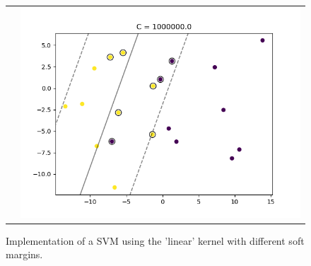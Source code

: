 \documentclass{beamer}
\begin{document}
\begin{frame}{}
\begin{figure}
\begin{tabular}{ll}
    		&
    		\includegraphics[scale=0.25]{img/SlackSVM04.png}
    	\end{tabular}
		\caption{Implementation of a SVM using the 'linear' kernel with different soft margins.}
		\label{fig:slacksvm}
	\end{figure}
\end{frame}
\end{document}

